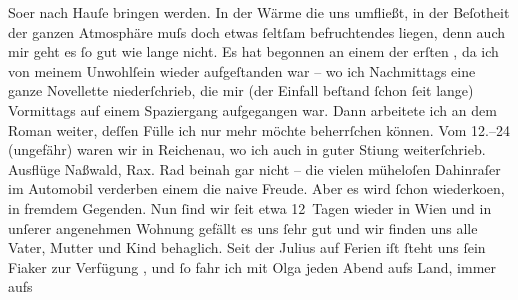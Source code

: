 \begin{ledgroupsized}[t]{13cm}
                  So{\geminationm}er nach Hauſe bringen werden. In der Wärme die uns
               umfließt, in der Beſo{\geminationn}theit der ganzen Atmosphäre muſs
               doch etwas ſeltſam befruchtendes liegen, denn auch mir geht es ſo gut wie lange
               nicht. Es hat begonnen an einem der erſten \label{K_L01422-1v}\label{K_L01422-1h}, da ich von meinem Unwohlſein wieder aufgeſtanden war – wo ich \introOben{}Nachmittags\introOben{} eine ganze Novellette
               niederſchrieb, die mir (der Einfall beſtand ſchon ſeit {\pb}lange) Vormittags auf einem Spaziergang aufgegangen war. Dann
               arbeitete ich an dem Roman
               weiter, deſſen Fülle ich nur mehr möchte beherrſchen können. Vom
                  12.–24 (ungefähr) waren wir in Reichenau, wo ich auch in guter Sti{\geminationm}ung weiterſchrieb. Ausflüge Naßwald, Rax. Rad beinah gar nicht – die vielen müheloſen
               Dahinraſer im Automobil verderben einem die naive Freude. Aber es wird ſchon
                  wiederko{\geminationm}en, in fremdem Gegenden.\pend
           \pstart
           Nun ſind wir ſeit etwa 12 Tagen wieder in Wien und
               in unſerer {\pb}angenehmen Wohnung gefällt es uns ſehr gut
               und wir finden uns alle Vater, Mutter und Kind
               behaglich. Seit der Julius auf Ferien iſt
               ſteht uns ſein Fiaker zur Verfügung , und ſo fahr
               ich mit Olga jeden Abend aufs Land, immer aufs

\end{ledgroupsized}
